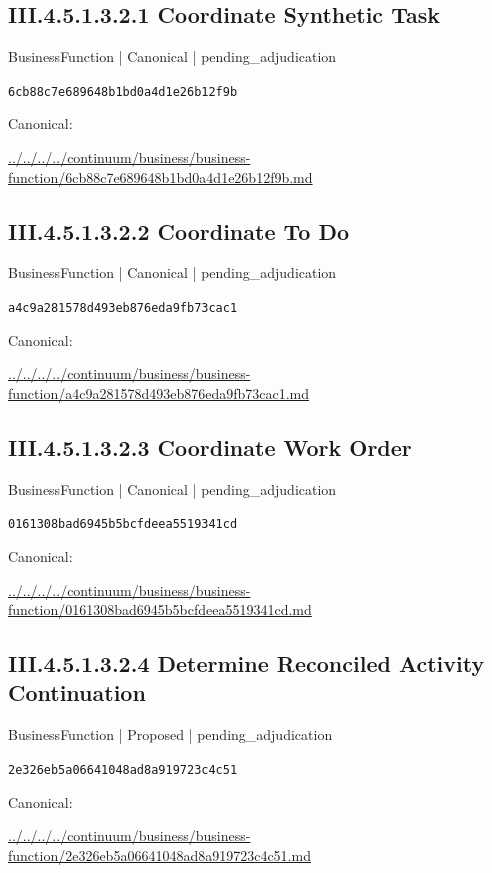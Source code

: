 \documentclass[10pt,a4paper]{article}
\begin{document}
\subsection*{III.4.5.1.3.2.1 Coordinate Synthetic Task}
\label{element-6cb88c7e689648b1bd0a4d1e26b12f9b}
{\small BusinessFunction | Canonical | pending\_adjudication}\par
\texttt{6cb88c7e689648b1bd0a4d1e26b12f9b}\par
Canonical: \par
{\footnotesize\url{../../../../continuum/business/business-function/6cb88c7e689648b1bd0a4d1e26b12f9b.md}}\par
\subsection*{III.4.5.1.3.2.2 Coordinate To Do}
\label{element-a4c9a281578d493eb876eda9fb73cac1}
{\small BusinessFunction | Canonical | pending\_adjudication}\par
\texttt{a4c9a281578d493eb876eda9fb73cac1}\par
Canonical: \par
{\footnotesize\url{../../../../continuum/business/business-function/a4c9a281578d493eb876eda9fb73cac1.md}}\par
\subsection*{III.4.5.1.3.2.3 Coordinate Work Order}
\label{element-0161308bad6945b5bcfdeea5519341cd}
{\small BusinessFunction | Canonical | pending\_adjudication}\par
\texttt{0161308bad6945b5bcfdeea5519341cd}\par
Canonical: \par
{\footnotesize\url{../../../../continuum/business/business-function/0161308bad6945b5bcfdeea5519341cd.md}}\par
\subsection*{III.4.5.1.3.2.4 Determine Reconciled Activity Continuation}
\label{element-2e326eb5a06641048ad8a919723c4c51}
{\small BusinessFunction | Proposed | pending\_adjudication}\par
\texttt{2e326eb5a06641048ad8a919723c4c51}\par
Canonical: \par
{\footnotesize\url{../../../../continuum/business/business-function/2e326eb5a06641048ad8a919723c4c51.md}}\par
\end{document}
